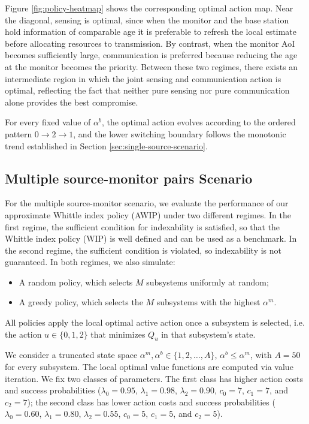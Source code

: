 \documentclass[letterpaper,journal]{IEEEtran}
\begin{document}
Figure \ref{fig:policy-heatmap} shows the corresponding optimal action map. Near the diagonal, sensing is optimal, since when the monitor and the base station hold information of comparable age it is preferable to refresh the local estimate before allocating resources to transmission. By contrast, when the monitor AoI becomes sufficiently large, communication is preferred because reducing the age at the monitor becomes the priority. Between these two regimes, there exists an intermediate region in which the joint sensing and communication action is optimal, reflecting the fact that neither pure sensing nor pure communication alone provides the best compromise.

For every fixed value of $\alpha^b$, the optimal action evolves according to the ordered pattern $0\to 2\to 1$, and the lower switching boundary follows the monotonic trend established in Section \ref{sec:single-source-scenario}.

    
\subsection{Multiple source-monitor pairs Scenario}
For the multiple source-monitor scenario, we evaluate the performance of our approximate Whittle index policy (AWIP) under two different regimes. In the first regime, the sufficient condition for indexability is satisfied, so that the Whittle index policy (WIP) is well defined and can be used as a benchmark. In the second regime, the sufficient condition is violated, so indexability is not guaranteed. In both regimes, we also simulate:
\begin{itemize}
    \item A random policy, which selects $M$ subsystems uniformly at random;
    \item A greedy policy, which selects the $M$ subsystems with the highest $\alpha^m$.
\end{itemize}
All policies apply the local optimal active action once a subsystem is selected, i.e. the action $u\in\{0,1,2\}$ that minimizes $Q_u$ in that subsystem's state.

We consider a truncated state space $\alpha^m,\alpha^b\in\{1,2,\dots,A\}$, $\alpha^b\leq\alpha^m$, with $A=50$ for every subsystem. The local optimal value functions are computed via value iteration. We fix two classes of parameters. The first class has higher action costs and success probabilities ($\lambda_0=0.95$, $\lambda_1=0.98$, $\lambda_2=0.90$, $c_0=7$, $c_1=7$, and $c_2=7$); the second class has lower action costs and success probabilities ($\lambda_0=0.60$, $\lambda_1=0.80$, $\lambda_2=0.55$, $c_0=5$, $c_1=5$, and $c_2=5$).
\end{document}
